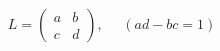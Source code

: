 \begin{equation}
L = \left(
\begin{array}{cc}
a & b \\
c & d
\end{array}
\right),~~~~~~(ad-bc = 1)
\end{equation}

